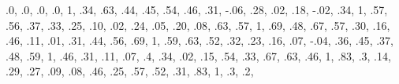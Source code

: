 \documentclass[
  english,
]{book}
\newenvironment{Shaded}{\begin{snugshade}}{\end{snugshade}}
\newcommand{\DecValTok}[1]{\textcolor[rgb]{0.00,0.00,0.81}{#1}}
\newcommand{\FloatTok}[1]{\textcolor[rgb]{0.00,0.00,0.81}{#1}}
\newcommand{\NormalTok}[1]{#1}
\begin{document}
\begin{Shaded}
\begin{Highlighting}[]
                          \FloatTok{.0}\NormalTok{, }\FloatTok{.0}\NormalTok{, }\FloatTok{.0}\NormalTok{, }\FloatTok{.0}\NormalTok{, }\DecValTok{1}\NormalTok{, }\FloatTok{.34}\NormalTok{, }\FloatTok{.63}\NormalTok{, }\FloatTok{.44}\NormalTok{, }\FloatTok{.45}\NormalTok{, }\FloatTok{.54}\NormalTok{, }\FloatTok{.46}\NormalTok{, }\FloatTok{.31}\NormalTok{, }\FloatTok{-.06}\NormalTok{, }
                          \FloatTok{.28}\NormalTok{, }\FloatTok{.02}\NormalTok{, }\FloatTok{.18}\NormalTok{, }\FloatTok{-.02}\NormalTok{, }\FloatTok{.34}\NormalTok{, }\DecValTok{1}\NormalTok{, }\FloatTok{.57}\NormalTok{, }\FloatTok{.56}\NormalTok{, }\FloatTok{.37}\NormalTok{, }\FloatTok{.33}\NormalTok{, }\FloatTok{.25}\NormalTok{, }\FloatTok{.10}\NormalTok{, }\FloatTok{.02}\NormalTok{,}
                          \FloatTok{.24}\NormalTok{, }\FloatTok{.05}\NormalTok{, }\FloatTok{.20}\NormalTok{, }\FloatTok{.08}\NormalTok{, }\FloatTok{.63}\NormalTok{, }\FloatTok{.57}\NormalTok{, }\DecValTok{1}\NormalTok{, }\FloatTok{.69}\NormalTok{, }\FloatTok{.48}\NormalTok{, }\FloatTok{.67}\NormalTok{, }\FloatTok{.57}\NormalTok{, }\FloatTok{.30}\NormalTok{, }\FloatTok{.16}\NormalTok{,}
                          \FloatTok{.46}\NormalTok{, }\FloatTok{.11}\NormalTok{, }\FloatTok{.01}\NormalTok{, }\FloatTok{.31}\NormalTok{, }\FloatTok{.44}\NormalTok{, }\FloatTok{.56}\NormalTok{, }\FloatTok{.69}\NormalTok{, }\DecValTok{1}\NormalTok{, }\FloatTok{.59}\NormalTok{, }\FloatTok{.63}\NormalTok{, }\FloatTok{.52}\NormalTok{, }\FloatTok{.32}\NormalTok{, }\FloatTok{.23}\NormalTok{,}
                          \FloatTok{.16}\NormalTok{, }\FloatTok{.07}\NormalTok{, }\FloatTok{-.04}\NormalTok{, }\FloatTok{.36}\NormalTok{, }\FloatTok{.45}\NormalTok{, }\FloatTok{.37}\NormalTok{, }\FloatTok{.48}\NormalTok{, }\FloatTok{.59}\NormalTok{, }\DecValTok{1}\NormalTok{, }\FloatTok{.46}\NormalTok{, }\FloatTok{.31}\NormalTok{, }\FloatTok{.11}\NormalTok{, }\FloatTok{.07}\NormalTok{,}
                          \FloatTok{.4}\NormalTok{, }\FloatTok{.34}\NormalTok{, }\FloatTok{.02}\NormalTok{, }\FloatTok{.15}\NormalTok{, }\FloatTok{.54}\NormalTok{, }\FloatTok{.33}\NormalTok{, }\FloatTok{.67}\NormalTok{, }\FloatTok{.63}\NormalTok{, }\FloatTok{.46}\NormalTok{, }\DecValTok{1}\NormalTok{, }\FloatTok{.83}\NormalTok{, }\FloatTok{.3}\NormalTok{, }\FloatTok{.14}\NormalTok{,}
                          \FloatTok{.29}\NormalTok{, }\FloatTok{.27}\NormalTok{, }\FloatTok{.09}\NormalTok{, }\FloatTok{.08}\NormalTok{, }\FloatTok{.46}\NormalTok{, }\FloatTok{.25}\NormalTok{, }\FloatTok{.57}\NormalTok{, }\FloatTok{.52}\NormalTok{, }\FloatTok{.31}\NormalTok{, }\FloatTok{.83}\NormalTok{, }\DecValTok{1}\NormalTok{, }\FloatTok{.3}\NormalTok{, }\FloatTok{.2}\NormalTok{, }

\end{Highlighting}
\end{Shaded}
\end{document}
